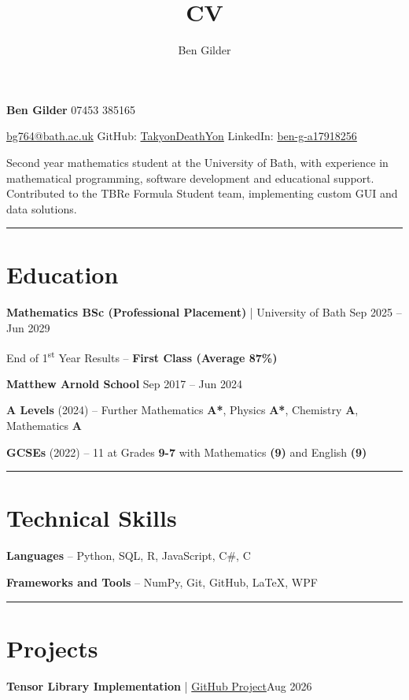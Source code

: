 \documentclass[11pt, a4paper]{article}
\author{Ben Gilder}
\title{CV}
\newcommand{\cvline}{\vspace{-4pt}\noindent\rule{\linewidth}{0.5pt}\vspace{-8pt}}
\begin{document}
{\Huge{\textbf{Ben Gilder}}} \hfill 07453 385165
\begin{center}
\href{mailto:bg764@bath.ac.uk}{bg764@bath.ac.uk} \hfill	
GitHub: \href{https://github.com/TakyonDeathYon}{TakyonDeathYon} \hfill 
LinkedIn: \href{https://linkedin.com/in/ben-g-a17918256}{ben-g-a17918256}
\end{center}

Second year mathematics student at the University of Bath, 
with experience in mathematical programming, software development 
and educational support. Contributed to the TBRe Formula 
Student team, implementing custom GUI and data solutions. 

\cvline
\section{Education}
{\large\textbf{Mathematics BSc (Professional Placement)} | University of Bath \hfill	Sep 2025 – Jun 2029}
\vspace{2pt}

End of 1\textsuperscript{st} Year Results – \textbf{First Class (Average 87\%)}

\vspace{2pt}
{\large\textbf{Matthew Arnold School}	\hfill Sep 2017 – Jun 2024}
\vspace{2pt}

\textbf{A Levels} (2024) – Further Mathematics \textbf{A*}, Physics \textbf{A*}, Chemistry \textbf{A}, Mathematics \textbf{A} 

\textbf{GCSEs} (2022) – 11 at Grades \textbf{9-7} with Mathematics \textbf{(9)} and English \textbf{(9)}

\cvline 
\section{Technical Skills}
{\large
\textbf{Languages} – Python, SQL, R, JavaScript, C\#, C

\vspace{2pt}

\textbf{Frameworks and Tools} – NumPy, Git, GitHub, LaTeX, WPF
}

\cvline
\section{Projects}

\vspace{2pt}
{\large\textbf{Tensor Library Implementation} | \href{https://github.com/TakyonDeathYon/Tensors}{GitHub Project}\hfill Aug 2026}
\vspace{2pt}
\end{document}
